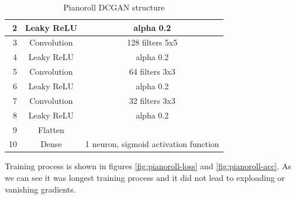 \documentclass[]{article}
\begin{document}
\begin{table}[h!]
\begin{tabular}{|r|c|c|}
		2                                    & Leaky ReLU          & alpha 0.2                             \\ \hline
		3                                    & Convolution         & 128 filters 5x5                       \\ \hline
		4                                    & Leaky ReLU          & alpha 0.2                             \\ \hline
		5                                    & Convolution         & 64 filters 3x3                        \\ \hline
		6                                    & Leaky ReLU          & alpha 0.2                             \\ \hline
		7                                    & Convolution         & 32 filters 3x3                        \\ \hline
		8                                    & Leaky ReLU          & alpha 0.2                             \\ \hline
		9                                    & Flatten             &                                       \\ \hline
		10                                   & Dense               & 1 neuron, sigmoid activation function \\ \hline
	\end{tabular}
	\caption{Pianoroll DCGAN structure}
	\label{pianoroll-dc-gan}
\end{table}

Training process is shown in figures \ref{fig:pianoroll-loss} and \ref{fig:pianoroll-acc}. As we can see it was longest training process and it did not lead to exploading or vanishing gradients. 
\end{document}
